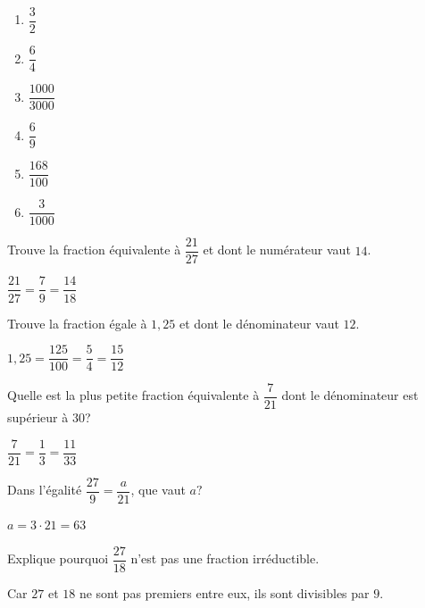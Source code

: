 \documentclass[../../syllabus_2.tex]{subfiles}
\begin{document}
\begin{solution}
  \begin{enumerate}
    \item $\dfrac{3}{2}$
    \item $\dfrac{6}{4}$
    \item $\dfrac{1000}{3000}$
    \item $\dfrac{6}{9}$
    \item $\dfrac{168}{100}$
    \item $\dfrac{3}{1000}$
  \end{enumerate}
\end{solution}

\begin{exercise}
  Trouve la fraction équivalente à $\dfrac{21}{27}$ et dont le numérateur vaut $14$.
\end{exercise}
\begin{solution}
  $\dfrac{21}{27} = \dfrac{7}{9} = \dfrac{14}{18}$
\end{solution}

\begin{exercise}
  Trouve la fraction égale à $1,25$ et dont le dénominateur vaut $12$.
\end{exercise}
\begin{solution}
  $1,25=\dfrac{125}{100}=\dfrac{5}{4}=\dfrac{15}{12}$
\end{solution}

\begin{exercise}
  Quelle est la plus petite fraction équivalente à $\dfrac{7}{21}$ dont le dénominateur est supérieur à $30$?
\end{exercise}
\begin{solution}
  $\dfrac{7}{21} = \dfrac{1}{3} = \dfrac{11}{33}$
\end{solution}

\begin{exercise}
  Dans l'égalité $\dfrac{27}{9} = \dfrac{a}{21}$, que vaut $a?$
\end{exercise}
\begin{solution}
  $a=3\cdot 21=63$
\end{solution}

\begin{exercise}
  Explique pourquoi $\dfrac{27}{18}$ n'est pas une fraction
  irréductible.
\end{exercise}
\begin{solution}
  Car $27$ et $18$ ne sont pas premiers entre eux, ils sont divisibles par $9$.
\end{solution}
\end{document}
